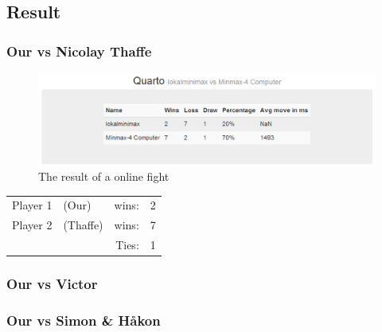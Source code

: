 \documentclass[12pt, a4paper]{article}
\begin{document}
\subsection{Result}
\subsubsection{Our vs Nicolay Thaffe}

\begin{figure}[h]

\includegraphics[width=19cm]{thaffe.png}
\caption{The result of a online fight}
\label{figure4}

\end{figure}


  \begin{tabular}{| l  l  r l |}
    \hline
 	Player 1 & (Our) & wins: & 2 \\
 	Player 2 & (Thaffe) & wins: & 7 \\
 	& &  Ties: & 1 \\
    \hline
  \end{tabular}

\subsubsection{Our vs Victor}

\subsubsection{Our vs Simon \& Håkon}
\end{document}
